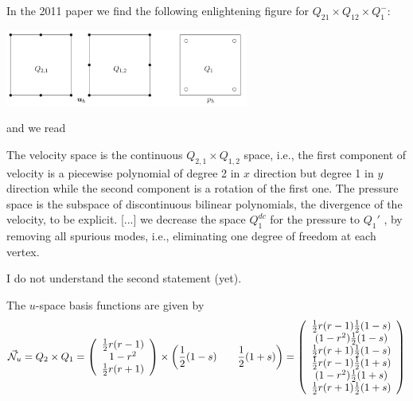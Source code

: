In the 2011 paper we find the following enlightening figure for $Q_{21}\times Q_{12}\times Q_1^-$:
\begin{center}
\includegraphics[width=8cm]{images/pair_qqq/huzh11}
\end{center}
and we read
\begin{displayquote}
{\color{darkgray}
The velocity
space is the continuous $Q_{2,1}\times Q_{1,2}$ space, i.e., the ﬁrst component of velocity
is a piecewise polynomial of degree 2 in $x$ direction but degree 1 in $y$ direction
while the second component is a rotation of the ﬁrst one. The pressure space
is the subspace of discontinuous bilinear polynomials, the divergence of the
velocity, to be explicit.
[...]
we decrease the space $Q_1^{dc}$ for the pressure to $Q_1'$ , by removing all spurious modes, i.e.,
eliminating one degree of freedom at each vertex.
}
\end{displayquote}
I do not understand the second statement (yet).


The $u$-space basis functions are given by 
\[
\vec{{\mathcal{N}}}_u = Q_2 \times Q_1 =
\left(
\begin{array}{c}
\frac12 r(r-1) \\
1-r^2 \\
\frac12 r(r+1)
\end{array}
\right)
\times
\left(
\frac12 (1-s) \qquad \frac12(1+s)
\right)
=
\left(
\begin{array}{c}
\frac12 r(r-1)  \frac12(1-s)\\ 
(1-r^2)         \frac12(1-s)\\
\frac12 r(r+1)  \frac12(1-s)\\
\frac12 r(r-1)  \frac12(1+s)\\
(1-r^2)         \frac12(1+s)\\
\frac12 r(r+1)  \frac12(1+s)
\end{array}
\right)
\]


